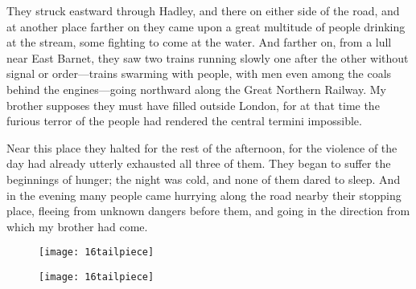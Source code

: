 They struck eastward through Hadley, and there on either side of the road, and at another place farther on they came upon a great multitude of people drinking at the stream, some fighting to come at the water. And farther on, from a lull near East Barnet, they saw two trains running slowly one after the other without signal or order—trains swarming with people, with men even among the coals behind the engines—going northward along the Great Northern Railway. My brother supposes they must have filled outside London, for at that time the furious terror of the people had rendered the central termini impossible.

Near this place they halted for the rest of the afternoon, for the violence of the day had already utterly exhausted all three of them. They began to suffer the beginnings of hunger; the night was cold, and none of them dared to sleep. And in the evening many people came hurrying along the road nearby their stopping place, fleeing from unknown dangers before them, and going in the direction from which my brother had come.

\makeatletter
{}
{%
	\begin{figure}[b!]
	\centering
	\texttt{[image: 16tailpiece]}
	\end{figure}
}{%
\begin{figure}[b!]
	\centering
	\texttt{[image: 16tailpiece]}
	\end{figure}
}
\makeatother
